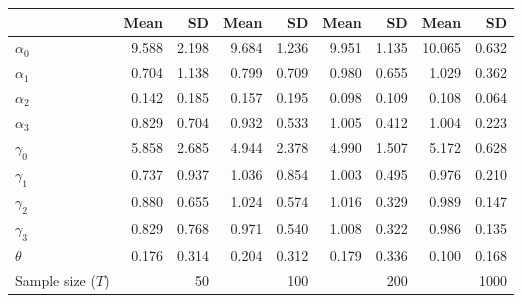 
\begin{tabular}[t]{lrrrrrrrr}
\toprule
  & Mean & SD & Mean  & SD  & Mean   & SD   & Mean    & SD   \\
\midrule
$\alpha_{0}$ & 9.588 & 2.198 & 9.684 & 1.236 & 9.951 & 1.135 & 10.065 & 0.632\\
$\alpha_{1}$ & 0.704 & 1.138 & 0.799 & 0.709 & 0.980 & 0.655 & 1.029 & 0.362\\
$\alpha_{2}$ & 0.142 & 0.185 & 0.157 & 0.195 & 0.098 & 0.109 & 0.108 & 0.064\\
$\alpha_{3}$ & 0.829 & 0.704 & 0.932 & 0.533 & 1.005 & 0.412 & 1.004 & 0.223\\
$\gamma_{0}$ & 5.858 & 2.685 & 4.944 & 2.378 & 4.990 & 1.507 & 5.172 & 0.628\\
$\gamma_{1}$ & 0.737 & 0.937 & 1.036 & 0.854 & 1.003 & 0.495 & 0.976 & 0.210\\
$\gamma_{2}$ & 0.880 & 0.655 & 1.024 & 0.574 & 1.016 & 0.329 & 0.989 & 0.147\\
$\gamma_{3}$ & 0.829 & 0.768 & 0.971 & 0.540 & 1.008 & 0.322 & 0.986 & 0.135\\
$\theta$ & 0.176 & 0.314 & 0.204 & 0.312 & 0.179 & 0.336 & 0.100 & 0.168\\
Sample size ($T$) &  & 50 &  & 100 &  & 200 &  & 1000\\
\bottomrule
\end{tabular}
